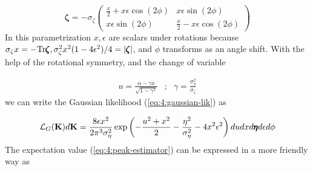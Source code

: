 \begin{equation}
\label{eq:4:hess-param}
\pmb{\zeta} = -\sigma_\zeta
\begin{pmatrix}
\displaystyle \frac{x}{2}+x\epsilon\cos(2\phi) & x\epsilon\sin(2\phi) \\
x\epsilon\sin(2\phi) & \displaystyle \frac{x}{2}-x\epsilon\cos(2\phi)
\end{pmatrix}
\end{equation}  
%
In this parametrization $x,\epsilon$ are scalars under rotations because $\sigma_\zeta x=-{\rm Tr}\pmb{\zeta}, \sigma_\zeta^2x^2(1-4\epsilon^2)/4=\vert\pmb{\zeta}\vert$, and $\phi$ transforms as an angle shift. With the help of the rotational symmetry, and the change of variable

\begin{equation}
\label{eq:4:wx}
\begin{matrix}
\displaystyle u = \frac{\alpha-\gamma x}{\sqrt{1-\gamma^2}} & ; & \displaystyle \gamma = \frac{\sigma_\eta^2}{\sigma_\zeta}
\end{matrix}
\end{equation} 
%
we can write the Gaussian likelihood (\ref{eq:4:gaussian-lik}) as 

\begin{equation}
\label{eq:4:gaussian-lik-pk}
\mathcal{L}_G(\mathbf{K})d\mathbf{K} = \frac{8\epsilon x^2}{2\pi^3\sigma_\eta^2}\exp\left(-\frac{u^2+x^2}{2}-\frac{\eta^2}{\sigma_\eta^2}-4x^2\epsilon^2\right)dudxd\pmb{\eta}d\epsilon d\phi
\end{equation} 
%
The expectation value (\ref{eq:4:peak-estimator}) can be expressed in a more friendly way as 

